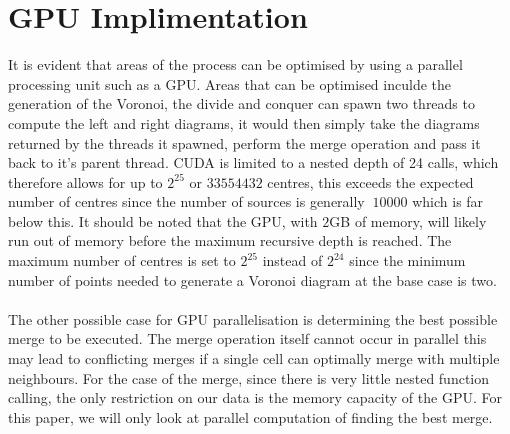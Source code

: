 \section{GPU Implimentation}
It is evident that areas of the process can be optimised by using a parallel processing unit such as a GPU. Areas that can be optimised inculde the generation of the Voronoi, the divide and conquer can spawn two threads to compute the left and right diagrams, it would then simply take the diagrams returned by the threads it spawned, perform the merge operation and pass it back to it's parent thread. CUDA is limited to a nested depth of 24 calls\cite{CUDA}, which therefore allows for up to $2^{25}$ or $33554432$ centres, this exceeds the expected number of centres since the number of sources is generally $~10000$ which is far below this. It should be noted that the GPU, with $2$GB of memory, will likely run out of memory before the maximum recursive depth is reached. The maximum number of centres is set to $2^{25}$ instead of $2^{24}$ since the minimum number of points needed to generate a Voronoi diagram at the base case is two.
\\
\\
The other possible case for GPU parallelisation is determining the best possible merge to be executed. The merge operation itself cannot occur in parallel this may lead to conflicting merges if a single cell can optimally merge with multiple neighbours. For the case of the merge, since there is very little nested function calling, the only restriction on our data is the memory capacity of the GPU. For this paper, we will only look at parallel computation of finding the best merge.